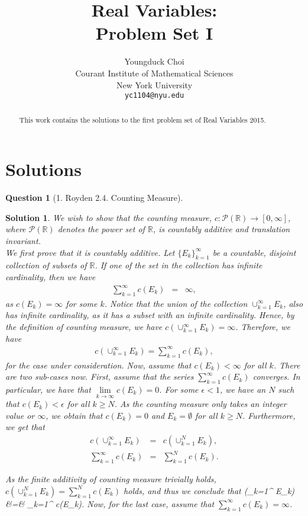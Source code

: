 \documentclass{article} %
\title{Real Variables: \\
Problem Set I}
\author{
Youngduck Choi \\
Courant Institute of Mathematical Sciences \\
New York University \\
\texttt{yc1104@nyu.edu} \\
}
\def\eQb#1\eQe{\begin{eqnarray*}#1\end{eqnarray*}}
\theoremstyle{quest}
\newtheorem*{question}{Question}
\newtheorem*{solution}{Solution}
\begin{document}
\maketitle

\begin{abstract}
This work contains the solutions to the first problem set of Real Variables 2015.
\end{abstract}

\section{Solutions}
\begin{question}[1. Royden 2.4. Counting Measure]
\end{question}
\begin{solution}
We wish to show that the counting measure, $c: \mathcal{P}(\mathbb{R}) 
\to [0,\infty]$, where $\mathcal{P}(\mathbb{R})$ denotes the power set of $\mathbb{R}$, is
countably additive and translation invariant. \\ 

We first prove that it is countably additive. Let $\{ E_k \}_{k=1}^{\infty}$ be a countable,
disjoint collection of subsets of $\mathbb{R}$. 
If one of the set in the collection has infinite cardinality, then 
we have  
\begin{eqnarray*}
\sum_{k=1}^{\infty} c(E_k) &=& \infty,
\end{eqnarray*}
as $c(E_k) = \infty$ for some $k$. Notice that the union of the collection $\cup_{k=1}^{\infty} E_k$,
also has infinite cardinality, as it has a subset with an infinite cardinality. Hence, by the definition
of counting measure, we have
$c(\cup_{k=1}^{\infty}E_k) = \infty$. Therefore, we have
\begin{eqnarray*}
c(\cup_{k=1}^{\infty}E_k) = \sum_{k=1}^{\infty} c(E_k),
\end{eqnarray*}
for the case under consideration. Now, assume that $c(E_k) < \infty$ for all $k$. There are
two sub-cases now. First, assume that the series $\sum_{k=1}^{\infty} c(E_k )$ converges. 
In particular, we have that $\underset{k \to \infty}{\lim} c(E_k ) = 0$. For some 
$\epsilon < 1$,
we have an $N$ such that $c(E_k ) < \epsilon$ for all $k \geq N$. As the counting measure only
takes an integer value or $\infty$, we obtain that $c(E_k) = 0$ and $E_k = \emptyset$
for all $k \geq N$. Furthermore, we get that  
\begin{eqnarray*}
c(\cup_{k=1}^{\infty} E_k) &=& c(\cup_{k=1}^{N}E_k), \\ 
\sum_{k=1}^{\infty} c(E_k) &=& \sum_{k=1}^{N} c(E_k).
\end{eqnarray*}

\pagebreak

As the finite additivity of counting measure trivially holds, 
$c(\cup_{k=1}^{N} E_k) = \sum_{k=1}^{N} c(E_k)$ holds, and thus we conclude that
\eQb
c(\cup_{k=1}^{\infty} E_k) &=& \sum_{k=1}^{\infty} c(E_k).
\eQe
Now, for the last case, assume that $\sum_{k=1}^{\infty} c(E_k ) = \infty$.
\end{solution}
\end{document}
